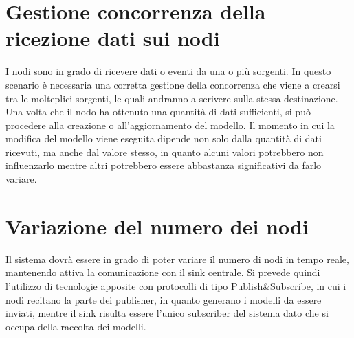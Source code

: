  \section{Gestione concorrenza della ricezione dati sui nodi}
		I nodi sono in grado di ricevere dati o eventi da una o più sorgenti. In questo scenario è necessaria una corretta gestione della concorrenza che viene a crearsi tra le molteplici sorgenti, le quali andranno a scrivere sulla stessa destinazione. Una volta che il nodo ha ottenuto una quantità di dati sufficienti, si può procedere alla creazione o all’aggiornamento del modello. Il momento in cui la modifica del modello viene eseguita dipende non solo dalla quantità di dati ricevuti, ma anche dal valore stesso, in quanto alcuni valori potrebbero non influenzarlo mentre altri potrebbero essere abbastanza significativi da farlo variare.

  \section{Variazione del numero dei nodi}
		Il sistema dovrà essere in grado di poter variare il numero di nodi in tempo reale, mantenendo attiva la comunicazione con il sink centrale. Si prevede quindi l’utilizzo di tecnologie apposite con protocolli di tipo Publish\&Subscribe, in cui i nodi recitano la parte dei publisher, in quanto generano i modelli da essere inviati, mentre il sink risulta essere l’unico subscriber del sistema dato che si occupa della raccolta dei modelli.
